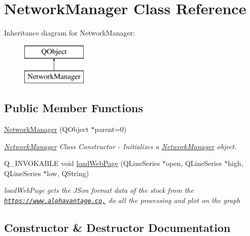\hypertarget{class_network_manager}{}\section{Network\+Manager Class Reference}
\label{class_network_manager}
Inheritance diagram for Network\+Manager\+:\begin{figure}[H]
\begin{center}
\leavevmode
\includegraphics[height=2.000000cm]{class_network_manager}
\end{center}
\end{figure}
\subsection*{Public Member Functions}
\begin{DoxyCompactItemize}
\item 
\hyperlink{class_network_manager_afdab2fd0ea156e42ef6936caa24e4602}{Network\+Manager} (Q\+Object $\ast$parent=0)
\begin{DoxyCompactList}\small\item\em \hyperlink{class_network_manager}{Network\+Manager} Class Constructor -\/ Initializes a \hyperlink{class_network_manager}{Network\+Manager} object. \end{DoxyCompactList}\item 
Q\+\_\+\+I\+N\+V\+O\+K\+A\+B\+LE void \hyperlink{class_network_manager_ac18e89037f60537fb2c32040a9720e07}{load\+Web\+Page} (Q\+Line\+Series $\ast$open, Q\+Line\+Series $\ast$high, Q\+Line\+Series $\ast$low, Q\+String)
\begin{DoxyCompactList}\small\item\em load\+Web\+Page gets the J\+Son format data of the stock from the \href{https://www.alphavantage.co,}{\tt https\+://www.\+alphavantage.\+co,} do all the processing and plot on the graph \end{DoxyCompactList}\end{DoxyCompactItemize}


\subsection{Constructor \& Destructor Documentation}
\mbox{\label{class_network_manager_afdab2fd0ea156e42ef6936caa24e4602}} 
